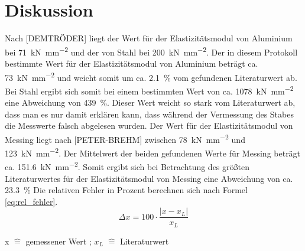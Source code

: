 \section{Diskussion}
Nach [DEMTRÖDER] liegt der Wert für der Elastizitätsmodul von Aluminium bei \SI{71}{\kilo\newton\per\milli\metre^2} und der von Stahl bei \SI{200}{\kilo\newton\per\milli\metre^2}.
Der in diesem Protokoll bestimmte Wert für der Elastizitätsmodul von Aluminium beträgt ca. \SI{73}{\kilo\newton\per\milli\metre^2} und weicht somit um ca. \SI{2.1}{\percent} vom gefundenen Literaturwert ab.
Bei Stahl ergibt sich somit bei einem bestimmten Wert von ca. \SI{1078}{\kilo\newton\per\milli\metre^2} eine Abweichung von \SI{439}{\percent}. Dieser Wert weicht so stark vom Literaturwert ab, dass man es
nur damit erklären kann, dass während der Vermessung des Stabes die
Messwerte falsch abgelesen wurden.
Der Wert für der Elastizitätsmodul von Messing liegt nach [PETER-BREHM] zwischen \SI{78}{\kilo\newton\per\milli\metre^2} und \SI{123}{\kilo\newton\per\milli\metre^2}. Der Mittelwert der beiden gefundenen Werte für Messing beträgt ca. \SI{151,6}{\kilo\newton\per\milli\metre^2}. Somit ergibt sich bei Betrachtung des größten Literaturwertes für der Elastizitätsmodul von Messing eine Abweichung von ca. \SI{23.3}{\percent}
Die relativen Fehler in Prozent berechnen sich nach Formel \eqref{eq:rel_fehler}.
\begin{equation}
\label{eq:rel_fehler}
\Delta x = 100 \cdot \frac{|x - x_L|}{x_L}    
\end{equation}
\begin{center}
x $\hat{=}$ gemessener Wert ; $x_L$ $\hat{=}$ Literaturwert
\end{center}